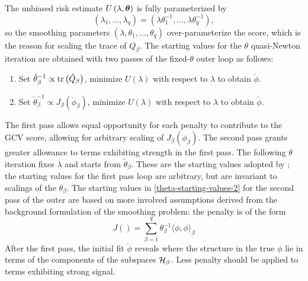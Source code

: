 \bigskip

The unbiased risk estimate $U\left(\lambda, \mbox{\boldmath $\theta$}\right)$ is fully parameterized by 
\begin{equation}
\left(\lambda_1, \dots, \lambda_q\right) = \left(\lambda \theta^{-1}_1, \dots, \lambda \theta^{-1}_q\right),
\end{equation}
\noindent
so the smoothing parameters $\left(\lambda, \theta_1, \dots, \theta_q\right)$ over-parameterize the score, which is the reason for scaling the trace of $Q_\beta$. The starting values for the $\theta$ quasi-Newton iteration are obtained with two passes of the fixed-$\theta$ outer loop as follows:
\begin{enumerate}
\item Set $\breve{\theta}_\beta^{-1} \propto \mbox{tr}\left( \tilde{Q}_\beta \right)$, minimize $U\left(\lambda\right)$ with respect to $\lambda$ to obtain $\breve{\phi}$. \label{theta-starting-values-1}
\item Set $\check{\theta}_\beta^{-1} \propto  J_\beta\left(\breve{\phi}_\beta \right)$, minimize $U\left(\lambda\right)$ with respect to $\lambda$ to obtain $\check{\phi}$. \label{theta-starting-values-2}
\end{enumerate}
\noindent
The first pass allows equal opportunity for each penalty to contribute to the GCV score, allowing for arbitrary scaling of $J_\beta \left(\phi_\beta\right)$. The second pass grants greater allowance to terms exhibiting strength in the first pass. The following $\theta$ iteration fixes $\lambda$ and starts from $\check{\theta}_\beta$. These are the starting values adopted by \cite{gu1991minimizing}; the starting values for the first pass loop are arbitrary, but are invariant to scalings of the $\theta_\beta$. The starting values in \ref{theta-starting-values-2} for the second pass of the outer are based on more involved assumptions derived from the background formulation of the smoothing problem: the penalty is of the form
\[
J\left(\right)= \sum_{\beta = 1}^q \theta^{-1}_\beta \langle \phi, \phi\rangle_\beta
\]
\noindent
After the first pass, the initial fit $\breve{\phi}$ reveals where the structure in the true $\phi$ lie in terms of the components of the subspaces $\mathcal{H}_\beta$. Less penalty should be applied to terms exhibiting strong signal.  


